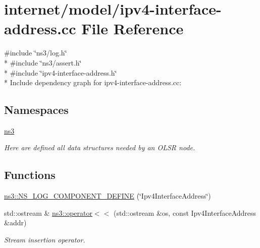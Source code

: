 \hypertarget{ipv4-interface-address_8cc}{}\section{internet/model/ipv4-\/interface-\/address.cc File Reference}
\label{ipv4-interface-address_8cc}
{\ttfamily \#include \char`\"{}ns3/log.\+h\char`\"{}}\\*
{\ttfamily \#include \char`\"{}ns3/assert.\+h\char`\"{}}\\*
{\ttfamily \#include \char`\"{}ipv4-\/interface-\/address.\+h\char`\"{}}\\*
Include dependency graph for ipv4-\/interface-\/address.cc\+:
\subsection*{Namespaces}
\begin{DoxyCompactItemize}
\item 
 \hyperlink{namespacens3}{ns3}
\begin{DoxyCompactList}\small\item\em Here are defined all data structures needed by an O\+L\+SR node. \end{DoxyCompactList}\end{DoxyCompactItemize}
\subsection*{Functions}
\begin{DoxyCompactItemize}
\item 
\hyperlink{namespacens3_a07a07941bbc09349c2a662a90b7a2699}{ns3\+::\+N\+S\+\_\+\+L\+O\+G\+\_\+\+C\+O\+M\+P\+O\+N\+E\+N\+T\+\_\+\+D\+E\+F\+I\+NE} (\char`\"{}Ipv4\+Interface\+Address\char`\"{})
\item 
std\+::ostream \& \hyperlink{namespacens3_a3510ae794ab61c2e23a5e9511f11de44}{ns3\+::operator$<$$<$} (std\+::ostream \&os, const Ipv4\+Interface\+Address \&addr)
\begin{DoxyCompactList}\small\item\em Stream insertion operator. \end{DoxyCompactList}\end{DoxyCompactItemize}
